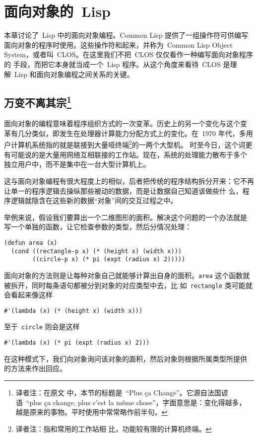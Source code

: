 
\chapter{面向对象的~Lisp}
\label{chap:object-oriented_lisp}

本章讨论了~Lisp 中的面向对象编程。Common Lisp 提供了一组操作符可供编写
面向对象的程序时使用。这些操作符和起来，并称为~Common Lisp Object
System，或者叫~CLOS。在这里我们不把~CLOS 仅仅看作一种编写面向对象程序的
手段，而把它本身就当成一个~Lisp 程序。从这个角度来看待~CLOS 是理
解~Lisp 和面向对象编程之间关系的关键。

\section[万变不离其宗]{万变不离其宗\protect \footnote{译者注：在原文
    中，本节的标题是~``Plus ça Change''。它源自法国谚语~``plus ça
    change, plus c'est la même chose''，字面意思是：变化得越多，
    越是原来的事物。平时使用中常常略作前半句。}}
\label{sec:plus_ca_change}

面向对象的编程意味着程序组织方式的一次变革。历史上的另一个变化与这个变
革有几分类似，即发生在处理器计算能力分配方式上的变化。在~1970 年代，多用
户计算机系统指的就是联接到大量哑终端\footnote{译者注：指和常用的工作站相
  比，功能较有限的计算机终端。}的一两个大型机。
时至今日，这个词更
有可能说的是大量用网络互相联接的工作站。现在，系统的处理能力散布于多个
独立用户中，而不是集中在一台大型计算机上。

这与面向对象编程有很大程度上的相似，后者把传统的程序结构拆分开来：它不再让单一的程序逻辑去操纵那些被动的数据，而是让数据自己知道该做些什
么，程序逻辑就隐含在这些新的数据``对象''间的交互过程之中。

举例来说，假设我们要算出一个二维图形的面积。解决这个问题的一个办法就是
写一个单独的函数，让它检查参数的类型，然后分情况处理：
\begin{lstlisting}
(defun area (x)
  (cond ((rectangle-p x) (* (height x) (width x)))
        ((circle-p x) (* pi (expt (radius x) 2)))))
\end{lstlisting}

面向对象的方法则是让每种对象自己就能够计算出自身的面积。\texttt{area}
这个函数就被拆开，同时每条语句都被分到对象的对应类型中去，比
如~\texttt{rectangle} 类可能就会看起来像这样
\begin{lstlisting}
#'(lambda (x) (* (height x) (width x)))
\end{lstlisting}
至于~\texttt{circle} 则会是这样
\begin{lstlisting}
#'(lambda (x) (* pi (expt (radius x) 2)))
\end{lstlisting}
在这种模式下，我们向对象询问该对象的面积，然后对象则根据所属类型所提供
的方法来作出回应。

